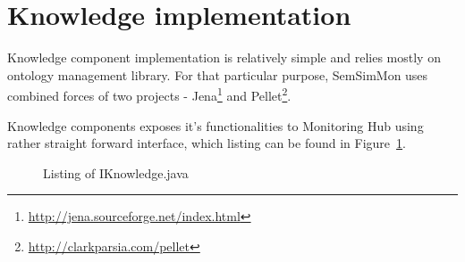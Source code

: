 \section{Knowledge implementation}

Knowledge component implementation is relatively simple and relies mostly on ontology management library. For that particular purpose, SemSimMon uses combined  forces of two projects - Jena\footnote{\url{http://jena.sourceforge.net/index.html}} and Pellet\footnote{\url{http://clarkparsia.com/pellet}}. 

Knowledge components exposes it\rq{}s functionalities to Monitoring Hub using rather straight forward interface, which listing can be found in Figure~\ref{fig:iknowledge_java}.

\begin{figure}[ht]
  \centering
  
  \caption{Listing of IKnowledge.java}
  \label{fig:iknowledge_java}
\end{figure} 
